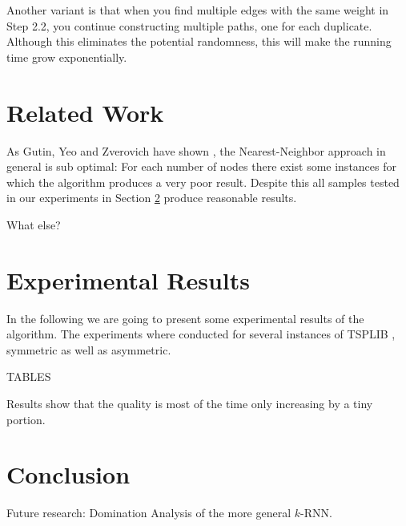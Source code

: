 \documentclass[11pt]{article}
\begin{document}
	Another variant is that when you find multiple edges with the same weight in Step 2.2, you continue constructing multiple paths, one for each duplicate. 
	Although this eliminates the potential randomness, this will make the running time grow exponentially.
	 
	\section{Related Work}
	\label{sec:related}
	
	As Gutin, Yeo and Zverovich have shown \cite{GUTIN2002}, the Nearest-Neighbor approach in general is sub optimal: 
	For each number of nodes there exist some instances for which the algorithm produces a very poor result. 
	Despite this all samples tested in our experiments in Section \ref{sec:experimental} produce reasonable results.
	
	What else?
	\section{Experimental Results}
	\label{sec:experimental}
	
	In the following we are going to present some experimental results of the algorithm. The experiments where conducted for several instances of TSPLIB \cite{REINELT1995}, symmetric as well as asymmetric.
	
	TABLES
	
	
	
	
	
	Results show that the quality is most of the time only increasing by a tiny portion.

	
	\section{Conclusion}
	\label{sec:conclusion}
	
	Future research: Domination Analysis of the more general $k$-RNN.
	
	
	
	
\end{document}
